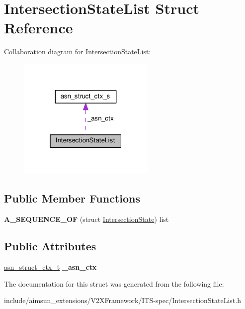 \hypertarget{structIntersectionStateList}{}\section{Intersection\+State\+List Struct Reference}
\label{structIntersectionStateList}


Collaboration diagram for Intersection\+State\+List\+:\nopagebreak
\begin{figure}[H]
\begin{center}
\leavevmode
\includegraphics[width=187pt]{structIntersectionStateList__coll__graph}
\end{center}
\end{figure}
\subsection*{Public Member Functions}
\begin{DoxyCompactItemize}
\item 
{\bfseries A\+\_\+\+S\+E\+Q\+U\+E\+N\+C\+E\+\_\+\+OF} (struct \hyperlink{structIntersectionState}{Intersection\+State}) list\hypertarget{structIntersectionStateList_ac060488aca8cc62d51653ea47f800ddd}{}\label{structIntersectionStateList_ac060488aca8cc62d51653ea47f800ddd}

\end{DoxyCompactItemize}
\subsection*{Public Attributes}
\begin{DoxyCompactItemize}
\item 
\hyperlink{structasn__struct__ctx__s}{asn\+\_\+struct\+\_\+ctx\+\_\+t} {\bfseries \+\_\+asn\+\_\+ctx}\hypertarget{structIntersectionStateList_afdd67c55018bc818bd8462a7efbd1707}{}\label{structIntersectionStateList_afdd67c55018bc818bd8462a7efbd1707}

\end{DoxyCompactItemize}


The documentation for this struct was generated from the following file\+:\begin{DoxyCompactItemize}
\item 
include/aimsun\+\_\+extensions/\+V2\+X\+Framework/\+I\+T\+S-\/spec/Intersection\+State\+List.\+h\end{DoxyCompactItemize}
